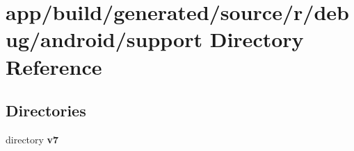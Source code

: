 \section{app/build/generated/source/r/debug/android/support Directory Reference}
\label{dir_8ddb16264ad470b09166e1e14dc12a5b}
\subsection*{Directories}
\begin{DoxyCompactItemize}
\item 
directory {\bf v7}
\end{DoxyCompactItemize}
